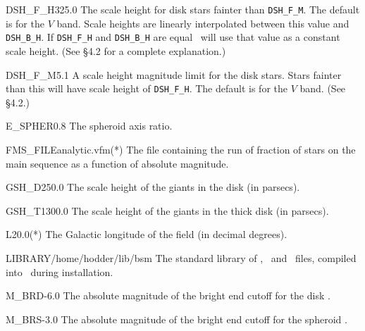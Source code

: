 \documentclass[11pt,twoside]{article}
\begin{document}
\begin{key}{DSH\_F\_H}{325.0}{}
The scale height for disk stars fainter than {\tt DSH\_F\_M}. The default is 
for the $V$ band. Scale heights are linearly interpolated between this value
and {\tt DSH\_B\_H}. If {\tt DSH\_F\_H} and {\tt DSH\_B\_H} are equal \bsm\
will use that value as a constant scale height. (See \S4.2 for a complete 
explanation.)
\end{key}

\begin{key}{DSH\_F\_M}{5.1}{}
A scale height magnitude limit for the disk stars. Stars fainter than this will
have scale height of {\tt DSH\_F\_H}. The default is for the $V$ band. 
(See \S4.2.)
\end{key}

\begin{key}{E\_SPHER}{0.8}{}
The spheroid axis ratio.
\end{key}

\begin{key}{FMS\_FILE}{analytic.vfm}{(*)}
The file containing the run of fraction of stars on the main sequence as a 
function of absolute magnitude.
\end{key}

\begin{key}{GSH\_D}{250.0}{}
The scale height of the giants in the disk (in parsecs).
\end{key}

\begin{key}{GSH\_T}{1300.0}{}
The scale height of the giants in the thick disk (in parsecs).
\end{key}

\begin{key}{L2}{0.0}{(*)}
The Galactic longitude of the field (in decimal degrees).
\end{key}

\begin{key}{LIBRARY}{/home/hodder/lib/bsm}{}
The standard library of \lf, \cmd\ and \fms\ files, compiled into \bsm\ during 
installation.
\end{key}

\begin{key}{M\_BRD}{-6.0}{}
The absolute magnitude of the bright end cutoff for the disk \lf.
\end{key}

\begin{key}{M\_BRS}{-3.0}{}
The absolute magnitude of the bright end cutoff for the spheroid \lf.
\end{key}
\end{document}
